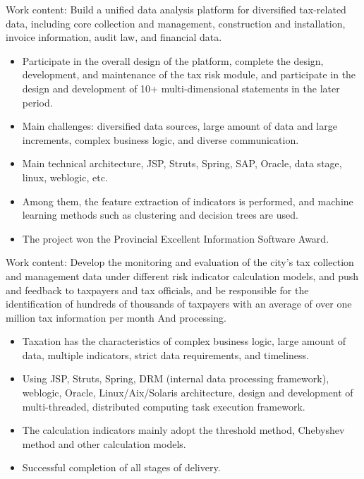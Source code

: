 \documentclass{resume}
\begin{document}
\begin{onehalfspacing}
Work content: Build a unified data analysis platform for diversified tax-related data, including core collection and management, construction and installation, invoice information, audit law, and financial data.
\begin{itemize}
  \item Participate in the overall design of the platform, complete the design, development, and maintenance of the tax risk module, and participate in the design and development of 10+ multi-dimensional statements in the later period.
  \item Main challenges: diversified data sources, large amount of data and large increments, complex business logic, and diverse communication.
  \item Main technical architecture, JSP, Struts, Spring, SAP, Oracle, data stage, linux, weblogic, etc.
  \item Among them, the feature extraction of indicators is performed, and machine learning methods such as clustering and decision trees are used.
  \item The project won the Provincial Excellent Information Software Award.
\end{itemize}
\end{onehalfspacing}

\begin{onehalfspacing}
Work content: Develop the monitoring and evaluation of the city's tax collection and management data under different risk indicator calculation models, and push and feedback to taxpayers and tax officials, and be responsible for the identification of hundreds of thousands of taxpayers with an average of over one million tax information per month And processing.
\begin{itemize}
  \item Taxation has the characteristics of complex business logic, large amount of data, multiple indicators, strict data requirements, and timeliness.
  \item Using JSP, Struts, Spring, DRM (internal data processing framework), weblogic, Oracle, Linux/Aix/Solaris architecture, design and development of multi-threaded, distributed computing task execution framework.
  \item The calculation indicators mainly adopt the threshold method, Chebyshev method and other calculation models.
  \item Successful completion of all stages of delivery.
\end{itemize}
\end{onehalfspacing}
\end{document}
